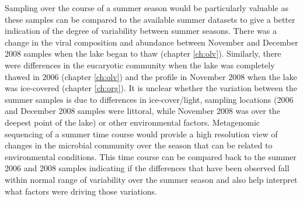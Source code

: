 Sampling over the course of a summer season would be particularly valuable as these samples can be compared to the available summer datasets to give a better indication of the degree of variability between summer seasons.
There was a change in the viral composition and abundance between November and December 2008 samples when the lake began to thaw (chapter \ref{ch:olv}).
Similarly, there were differences in the eucaryotic community when the lake was completely thawed in 2006 (chapter \ref{ch:olv}) and the profile in November 2008 when the lake was ice-covered (chapter \ref{ch:org}).
It is unclear whether the variation between the summer samples is due to differences in ice-cover/light, sampling locations  (2006 and December 2008 samples were littoral, while November 2008 was over the deepest point of the lake) or other environmental factors.
Metagenomic sequencing of a summer time course would provide a high resolution view of changes in the microbial community over the season that can be related to environmental conditions.
This time course can be compared back to the summer 2006 and 2008 samples indicating if the differences that have been observed fall within normal range of variability over the summer season and also help interpret what factors were driving those variations.


